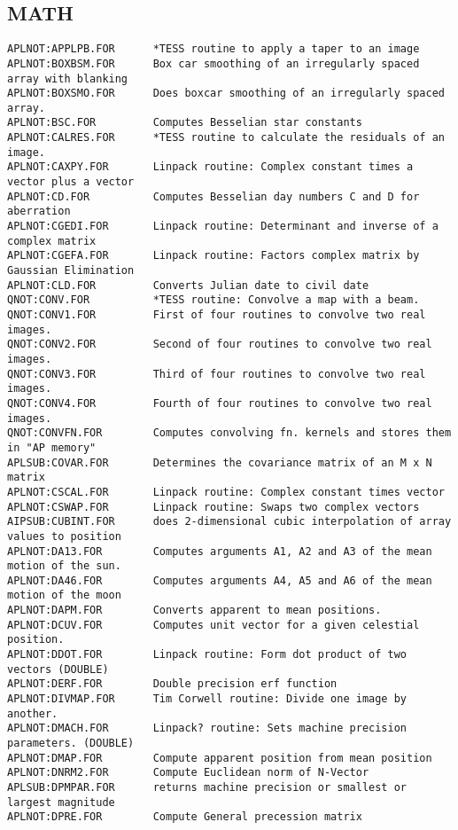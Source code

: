 \subsection{MATH}
\begin{verbatim}
APLNOT:APPLPB.FOR      *TESS routine to apply a taper to an image
APLNOT:BOXBSM.FOR      Box car smoothing of an irregularly spaced array with blanking
APLNOT:BOXSMO.FOR      Does boxcar smoothing of an irregularly spaced array.
APLNOT:BSC.FOR         Computes Besselian star constants
APLNOT:CALRES.FOR      *TESS routine to calculate the residuals of an image.
APLNOT:CAXPY.FOR       Linpack routine: Complex constant times a vector plus a vector
APLNOT:CD.FOR          Computes Besselian day numbers C and D for aberration
APLNOT:CGEDI.FOR       Linpack routine: Determinant and inverse of a complex matrix
APLNOT:CGEFA.FOR       Linpack routine: Factors complex matrix by Gaussian Elimination
APLNOT:CLD.FOR         Converts Julian date to civil date
QNOT:CONV.FOR          *TESS routine: Convolve a map with a beam.
QNOT:CONV1.FOR         First of four routines to convolve two real images.
QNOT:CONV2.FOR         Second of four routines to convolve two real images.
QNOT:CONV3.FOR         Third of four routines to convolve two real images.
QNOT:CONV4.FOR         Fourth of four routines to convolve two real images.
QNOT:CONVFN.FOR        Computes convolving fn. kernels and stores them in "AP memory"
APLSUB:COVAR.FOR       Determines the covariance matrix of an M x N matrix
APLNOT:CSCAL.FOR       Linpack routine: Complex constant times vector
APLNOT:CSWAP.FOR       Linpack routine: Swaps two complex vectors
AIPSUB:CUBINT.FOR      does 2-dimensional cubic interpolation of array values to position
APLNOT:DA13.FOR        Computes arguments A1, A2 and A3 of the mean motion of the sun.
APLNOT:DA46.FOR        Computes arguments A4, A5 and A6 of the mean motion of the moon
APLNOT:DAPM.FOR        Converts apparent to mean positions.
APLNOT:DCUV.FOR        Computes unit vector for a given celestial position.
APLNOT:DDOT.FOR        Linpack routine: Form dot product of two vectors (DOUBLE)
APLNOT:DERF.FOR        Double precision erf function
APLNOT:DIVMAP.FOR      Tim Corwell routine: Divide one image by another.
APLNOT:DMACH.FOR       Linpack? routine: Sets machine precision parameters. (DOUBLE)
APLNOT:DMAP.FOR        Compute apparent position from mean position
APLNOT:DNRM2.FOR       Compute Euclidean norm of N-Vector
APLSUB:DPMPAR.FOR      returns machine precision or smallest or largest magnitude
APLNOT:DPRE.FOR        Compute General precession matrix

\end{verbatim}
